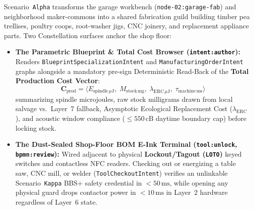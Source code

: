 Scenario~\texttt{Alpha} transforms the garage workbench (\texttt{node-02:garage-fab}) and neighborhood maker-commons into a shared fabrication guild building timber pea trellises, poultry coops, root-washer jigs, CNC joinery, and replacement appliance parts. Two Constellation surfaces anchor the shop floor:
\begin{itemize}
    \item \textbf{The Parametric Blueprint \& Total Cost Browser (\texttt{intent:author}):} Renders \texttt{BlueprintSpecializationIntent} and \texttt{ManufacturingOrderIntent} graphs alongside a mandatory pre-sign Deterministic Read-Back of the \textbf{Total Production Cost Vector}:
    \begin{equation}
        \mathbf{C}_{\mathrm{prod}} = \bigl\langle E_{\mathrm{spindle}\,\mu\mathrm{J}},\; M_{\mathrm{stock}\,\mathrm{mg}},\; \lambda_{\mathrm{ERC}\,\mu\mathrm{J}},\; \tau_{\mathrm{machine}\,\mathrm{ms}} \bigr\rangle
    \end{equation}
    summarizing spindle microjoules, raw stock milligrams drawn from local salvage vs.\ Layer~7 fallback, Asymptotic Ecological Replacement Cost ($\lambda_{\mathrm{ERC}}$), and acoustic window compliance ($\le 550\,\mathrm{cB}$ daytime boundary cap) before locking stock.
    \item \textbf{The Dust-Sealed Shop-Floor BOM E-Ink Terminal (\texttt{tool:unlock}, \texttt{bpmn:review}):} Wired adjacent to physical \textbf{Lockout/Tagout (\texttt{LOTO})} keyed switches and contactless NFC readers. Checking out or energizing a table saw, CNC mill, or welder (\texttt{ToolCheckoutIntent}) verifies an unlinkable Scenario~\texttt{Kappa} BBS+ safety credential in $< 50\,\mathrm{ms}$, while opening any physical guard drops contactor power in $< 10\,\mathrm{ms}$ in Layer~2 hardware regardless of Layer~6 state.
\end{itemize}

